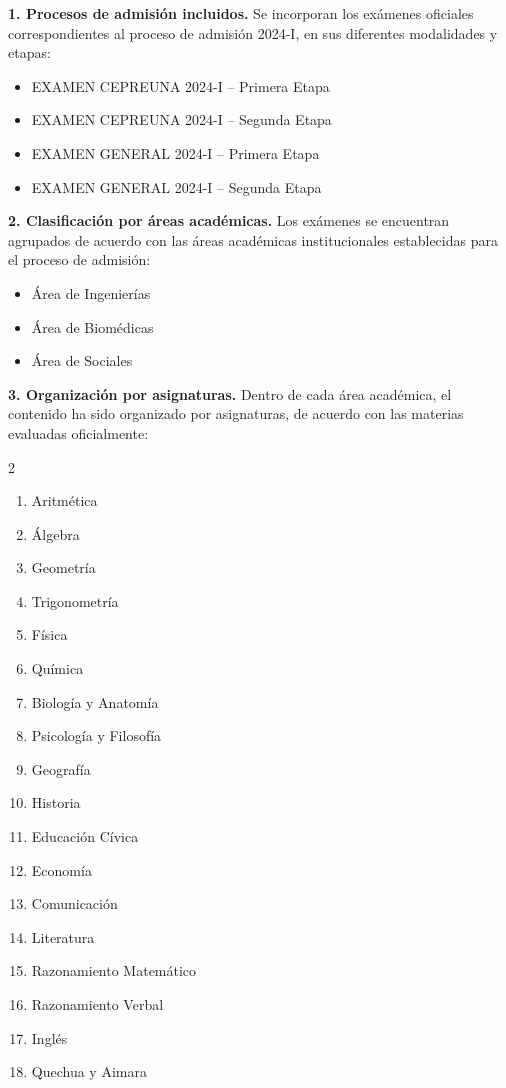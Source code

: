 \textbf{1. Procesos de admisión incluidos.}  
Se incorporan los exámenes oficiales correspondientes al proceso de admisión
2024-I, en sus diferentes modalidades y etapas:
\begin{itemize}
	\item EXAMEN CEPREUNA 2024-I – Primera Etapa
	\item EXAMEN CEPREUNA 2024-I – Segunda Etapa
	\item EXAMEN GENERAL 2024-I – Primera Etapa
	\item EXAMEN GENERAL 2024-I – Segunda Etapa
\end{itemize}

\textbf{2. Clasificación por áreas académicas.}  
Los exámenes se encuentran agrupados de acuerdo con las áreas académicas
institucionales establecidas para el proceso de admisión:
\begin{itemize}
	\item Área de Ingenierías
	\item Área de Biomédicas
	\item Área de Sociales
\end{itemize}

\textbf{3. Organización por asignaturas.}  
Dentro de cada área académica, el contenido ha sido organizado por asignaturas,
de acuerdo con las materias evaluadas oficialmente:
\begin{multicols}{2}
\begin{enumerate}
	\item Aritmética
	\item Álgebra
	\item Geometría
	\item Trigonometría
	\item Física
	\item Química
	\item Biología y Anatomía
	\item Psicología y Filosofía
	\item Geografía
	\item Historia
	\item Educación Cívica
	\item Economía
	\item Comunicación
	\item Literatura
	\item Razonamiento Matemático
	\item Razonamiento Verbal
	\item Inglés
	\item Quechua y Aimara
\end{enumerate}
\end{multicols}

